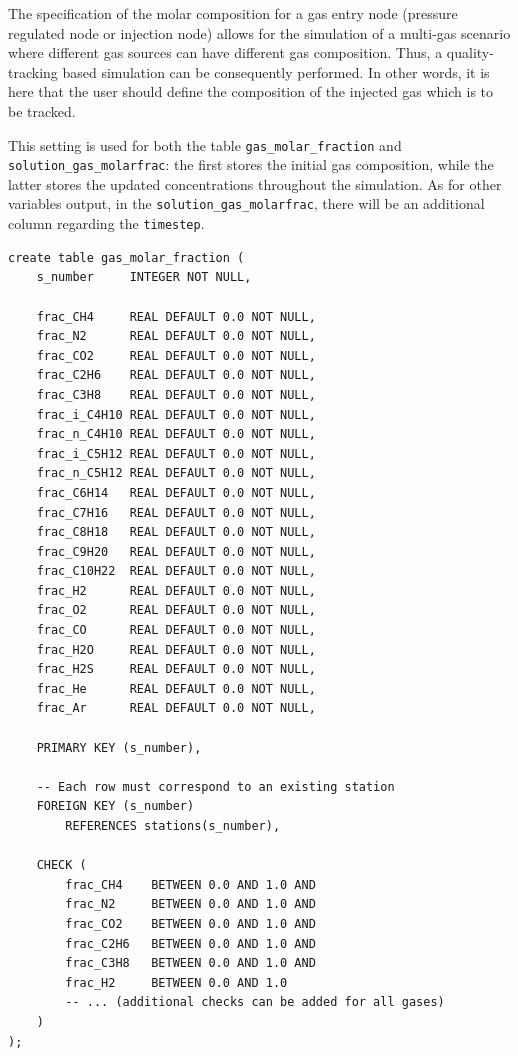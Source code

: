  The specification of the molar composition for a gas entry node (pressure regulated node or injection node) allows for the simulation of a multi-gas scenario where different gas sources can have different gas composition. Thus, a quality-tracking based simulation can be consequently performed. In other words, it is here that the user should define the composition of the injected gas which is to be tracked.

This setting is used for both the table \texttt{gas\_molar\_fraction} and \texttt{solution\_gas\_molarfrac}: the first stores the initial gas composition, while the latter stores the updated concentrations throughout the simulation. As for other variables output, in the \texttt{solution\_gas\_molarfrac}, there will be an additional column regarding the \texttt{timestep}.

\begin{verbatim}
create table gas_molar_fraction (
    s_number     INTEGER NOT NULL,

    frac_CH4     REAL DEFAULT 0.0 NOT NULL,
    frac_N2      REAL DEFAULT 0.0 NOT NULL,
    frac_CO2     REAL DEFAULT 0.0 NOT NULL,
    frac_C2H6    REAL DEFAULT 0.0 NOT NULL,
    frac_C3H8    REAL DEFAULT 0.0 NOT NULL,
    frac_i_C4H10 REAL DEFAULT 0.0 NOT NULL,
    frac_n_C4H10 REAL DEFAULT 0.0 NOT NULL,
    frac_i_C5H12 REAL DEFAULT 0.0 NOT NULL,
    frac_n_C5H12 REAL DEFAULT 0.0 NOT NULL,
    frac_C6H14   REAL DEFAULT 0.0 NOT NULL,
    frac_C7H16   REAL DEFAULT 0.0 NOT NULL,
    frac_C8H18   REAL DEFAULT 0.0 NOT NULL,
    frac_C9H20   REAL DEFAULT 0.0 NOT NULL,
    frac_C10H22  REAL DEFAULT 0.0 NOT NULL,
    frac_H2      REAL DEFAULT 0.0 NOT NULL,
    frac_O2      REAL DEFAULT 0.0 NOT NULL,
    frac_CO      REAL DEFAULT 0.0 NOT NULL,
    frac_H2O     REAL DEFAULT 0.0 NOT NULL,
    frac_H2S     REAL DEFAULT 0.0 NOT NULL,
    frac_He      REAL DEFAULT 0.0 NOT NULL,
    frac_Ar      REAL DEFAULT 0.0 NOT NULL,

    PRIMARY KEY (s_number),

    -- Each row must correspond to an existing station
    FOREIGN KEY (s_number)
        REFERENCES stations(s_number),

    CHECK (
        frac_CH4    BETWEEN 0.0 AND 1.0 AND
        frac_N2     BETWEEN 0.0 AND 1.0 AND
        frac_CO2    BETWEEN 0.0 AND 1.0 AND
        frac_C2H6   BETWEEN 0.0 AND 1.0 AND
        frac_C3H8   BETWEEN 0.0 AND 1.0 AND
        frac_H2     BETWEEN 0.0 AND 1.0
        -- ... (additional checks can be added for all gases)
    )
);
\end{verbatim}

